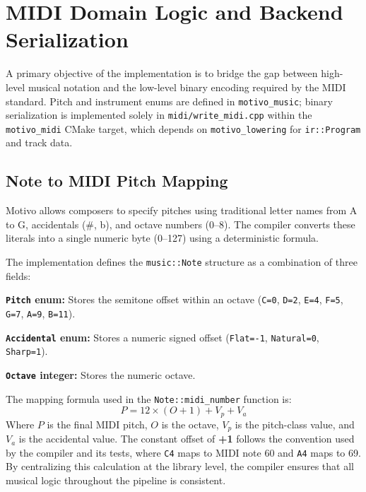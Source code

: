 \section{MIDI Domain Logic and Backend Serialization}\label{sec:midi-backend-design}

A primary objective of the implementation is to bridge the gap between high-level musical notation and the low-level
binary encoding required by the MIDI standard.
Pitch and instrument enums are defined in \texttt{motivo\_music}; binary serialization is implemented solely in
\texttt{midi/write\_midi.cpp} within the \texttt{motivo\_midi} CMake target, which depends on \texttt{motivo\_lowering}
for \texttt{ir::Program} and track data.

\subsection{Note to MIDI Pitch Mapping}\label{detail-subsec:note-to-midi-pitch-mapping}

Motivo allows composers to specify pitches using traditional letter names from A to G, accidentals (\#, b), and
octave numbers
(0--8).
The compiler converts these literals into a single numeric byte (0--127) using a deterministic formula.

The implementation defines the \texttt{music::Note} structure as a combination of three fields:

\noindent \textbf{\texttt{Pitch} enum:} Stores the semitone offset within an octave (\texttt{C=0}, \texttt{D=2},
\texttt{E=4}, \texttt{F=5}, \texttt{G=7}, \texttt{A=9}, \texttt{B=11}).

\noindent \textbf{\texttt{Accidental} enum:} Stores a numeric signed offset (\texttt{Flat=-1}, \texttt{Natural=0},
\texttt{Sharp=1}).

\noindent \textbf{\texttt{Octave} integer:} Stores the numeric octave.

The mapping formula used in the \texttt{Note::midi\_number} function is:
\begin{equation}
  P = 12 \times (O + 1) + V_p + V_a\label{eq:midi-pitch-detail}
\end{equation}
Where $P$ is the final MIDI pitch, $O$ is the octave, $V_p$ is the pitch-class value, and $V_a$ is the accidental value.
The constant offset of \textbf{+1} follows the convention used by the compiler and its tests, where \texttt{C4} maps to
MIDI note 60 and \texttt{A4} maps to 69.
By centralizing this calculation at the library level, the compiler ensures that all musical logic throughout the
pipeline is consistent.

